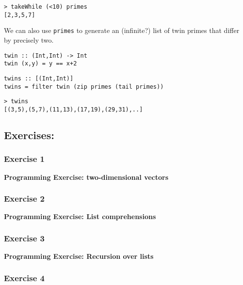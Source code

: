 \begin{multicols}{2}
\begin{lstlisting}
> takeWhile (<10) primes
[2,3,5,7]
\end{lstlisting}

We can also use \lstinline{primes} to generate an (infinite?) list of twin primes that differ by precisely two.
\begin{lstlisting}
twin :: (Int,Int) -> Int
twin (x,y) = y == x+2
\end{lstlisting}

\begin{lstlisting}
twins :: [(Int,Int)]
twins = filter twin (zip primes (tail primes))
\end{lstlisting}

\begin{lstlisting}
> twins
[(3,5),(5,7),(11,13),(17,19),(29,31),..]
\end{lstlisting}


\newpage
\subsection{Exercises:}

\subsubsection{Exercise 1}

\end{multicols}
\textbf{Programming Exercise: two-dimensional vectors}\\

\newpage
\begin{multicols}{2}

\subsubsection{Exercise 2}

\end{multicols}
\textbf{Programming Exercise: List comprehensions}\\

\newpage
\begin{multicols}{2}

\subsubsection{Exercise 3}

\end{multicols}
\textbf{Programming Exercise: Recursion over lists}\\

\newpage
\begin{multicols}{2}

\subsubsection{Exercise 4}


\end{multicols}
